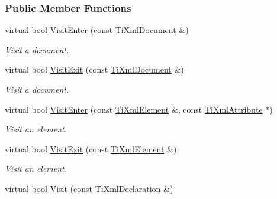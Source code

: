 \subsubsection*{Public Member Functions}
\begin{DoxyCompactItemize}
\item 
\hypertarget{class_ti_xml_visitor_a07baecb52dd7d8716ae2a48ad0956ee0}{
virtual bool \hyperlink{class_ti_xml_visitor_a07baecb52dd7d8716ae2a48ad0956ee0}{VisitEnter} (const \hyperlink{class_ti_xml_document}{TiXmlDocument} \&)}
\label{class_ti_xml_visitor_a07baecb52dd7d8716ae2a48ad0956ee0}

\begin{DoxyCompactList}\small\item\em Visit a document. \item\end{DoxyCompactList}\item 
\hypertarget{class_ti_xml_visitor_aa0ade4f27087447e93974e975c3246ad}{
virtual bool \hyperlink{class_ti_xml_visitor_aa0ade4f27087447e93974e975c3246ad}{VisitExit} (const \hyperlink{class_ti_xml_document}{TiXmlDocument} \&)}
\label{class_ti_xml_visitor_aa0ade4f27087447e93974e975c3246ad}

\begin{DoxyCompactList}\small\item\em Visit a document. \item\end{DoxyCompactList}\item 
\hypertarget{class_ti_xml_visitor_af6c6178ffa517bbdba95d70490875fff}{
virtual bool \hyperlink{class_ti_xml_visitor_af6c6178ffa517bbdba95d70490875fff}{VisitEnter} (const \hyperlink{class_ti_xml_element}{TiXmlElement} \&, const \hyperlink{class_ti_xml_attribute}{TiXmlAttribute} $\ast$)}
\label{class_ti_xml_visitor_af6c6178ffa517bbdba95d70490875fff}

\begin{DoxyCompactList}\small\item\em Visit an element. \item\end{DoxyCompactList}\item 
\hypertarget{class_ti_xml_visitor_aec2b1f8116226d52f3a1b95dafd3a32c}{
virtual bool \hyperlink{class_ti_xml_visitor_aec2b1f8116226d52f3a1b95dafd3a32c}{VisitExit} (const \hyperlink{class_ti_xml_element}{TiXmlElement} \&)}
\label{class_ti_xml_visitor_aec2b1f8116226d52f3a1b95dafd3a32c}

\begin{DoxyCompactList}\small\item\em Visit an element. \item\end{DoxyCompactList}\item 
\hypertarget{class_ti_xml_visitor_afad71c71ce6473fb9b4b64cd92de4a19}{
virtual bool \hyperlink{class_ti_xml_visitor_afad71c71ce6473fb9b4b64cd92de4a19}{Visit} (const \hyperlink{class_ti_xml_declaration}{TiXmlDeclaration} \&)}
\label{class_ti_xml_visitor_afad71c71ce6473fb9b4b64cd92de4a19}


\end{DoxyCompactItemize}
